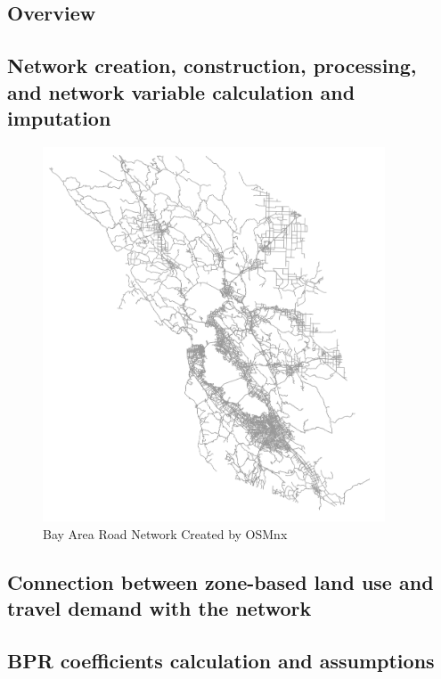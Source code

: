 \subsection{Overview}


\subsection{Network creation, construction, processing, and network variable calculation and imputation}

\begin{figure}[htp]
\center
\includegraphics[width=4in]
{graphics/bay_area_network.png}
\caption{Bay Area Road Network Created by OSMnx}
\label{fig:bay_area_road_network}
\end{figure}

\subsection{Connection between zone-based land use and travel demand with the network}


\subsection{BPR coefficients calculation and assumptions}

